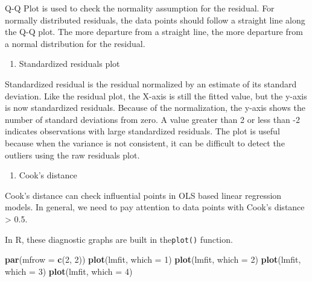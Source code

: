 \documentclass[12pt,]{krantz}
\makeatletter
\newenvironment{Shaded}{\begin{snugshade}}{\end{snugshade}}
\newcommand{\DataTypeTok}[1]{\textcolor[rgb]{0.27,0.27,0.27}{#1}}
\newcommand{\DecValTok}[1]{\textcolor[rgb]{0.06,0.06,0.06}{#1}}
\newcommand{\KeywordTok}[1]{\textcolor[rgb]{0.27,0.27,0.27}{\textbf{#1}}}
\newcommand{\NormalTok}[1]{#1}
\providecommand{\tightlist}{%
  \setlength{\itemsep}{0pt}\setlength{\parskip}{0pt}}
\newenvironment{kframe}{%
\medskip{}
\setlength{\fboxsep}{.8em}
 \def\at@end@of@kframe{}%
 \ifinner\ifhmode%
  \def\at@end@of@kframe{\end{minipage}}%
  \begin{minipage}{\columnwidth}%
 \fi\fi%
 \def\FrameCommand##1{\hskip\@totalleftmargin \hskip-\fboxsep
 \colorbox{shadecolor}{##1}\hskip-\fboxsep
     \hskip-\linewidth \hskip-\@totalleftmargin \hskip\columnwidth}%
 \MakeFramed {\advance\hsize-\width
   \@totalleftmargin\z@ \linewidth\hsize
   \@setminipage}}%
 {\par\unskip\endMakeFramed%
 \at@end@of@kframe}
\renewenvironment{Shaded}{\begin{kframe}}{\end{kframe}}
\makeatother
\begin{document}
Q-Q Plot is used to check the normality assumption for the residual. For normally distributed residuals, the data points should follow a straight line along the Q-Q plot. The more departure from a straight line, the more departure from a normal distribution for the residual.

\begin{enumerate}
\def\labelenumi{(\arabic{enumi})}
\setcounter{enumi}{2}
\tightlist
\item
  Standardized residuals plot 
\end{enumerate}

Standardized residual is the residual normalized by an estimate of its standard deviation. Like the residual plot, the X-axis is still the fitted value, but the y-axis is now standardized residuals. Because of the normalization, the y-axis shows the number of standard deviations from zero. A value greater than 2 or less than -2 indicates observations with large standardized residuals. The plot is useful because when the variance is not consistent, it can be difficult to detect the outliers using the raw residuals plot.

\begin{enumerate}
\def\labelenumi{(\arabic{enumi})}
\setcounter{enumi}{3}
\tightlist
\item
  Cook's distance 
\end{enumerate}

Cook's distance can check influential points in OLS based linear regression models. In general, we need to pay attention to data points with Cook's distance \textgreater{} 0.5.

In R, these diagnostic graphs are built in the\texttt{plot()} function.

\begin{Shaded}
\begin{Highlighting}[]
\KeywordTok{par}\NormalTok{(}\DataTypeTok{mfrow =} \KeywordTok{c}\NormalTok{(}\DecValTok{2}\NormalTok{, }\DecValTok{2}\NormalTok{))}
\KeywordTok{plot}\NormalTok{(lmfit, }\DataTypeTok{which =} \DecValTok{1}\NormalTok{)}
\KeywordTok{plot}\NormalTok{(lmfit, }\DataTypeTok{which =} \DecValTok{2}\NormalTok{)}
\KeywordTok{plot}\NormalTok{(lmfit, }\DataTypeTok{which =} \DecValTok{3}\NormalTok{)}
\KeywordTok{plot}\NormalTok{(lmfit, }\DataTypeTok{which =} \DecValTok{4}\NormalTok{)}
\end{Highlighting}
\end{Shaded}
\end{document}
